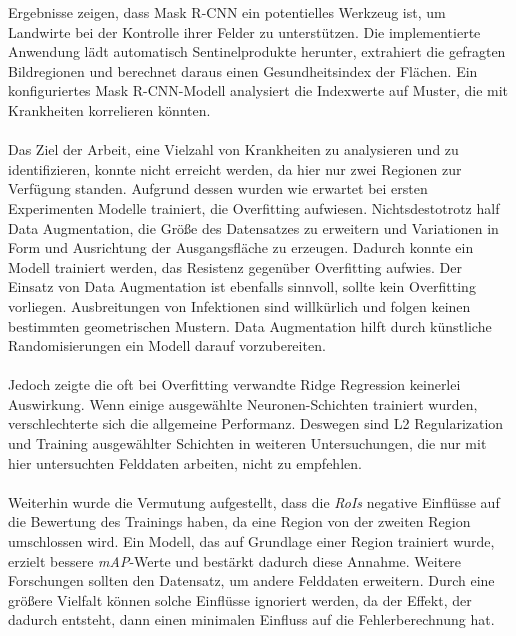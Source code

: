 Ergebnisse zeigen, dass Mask R-CNN ein potentielles Werkzeug ist, um Landwirte bei der Kontrolle ihrer Felder zu unterstützen. Die implementierte Anwendung lädt automatisch Sentinelprodukte herunter, extrahiert die gefragten Bildregionen und berechnet daraus einen Gesundheitsindex der Flächen. Ein konfiguriertes Mask R-CNN-Modell analysiert die Indexwerte auf Muster, die mit Krankheiten korrelieren könnten. 
\\\\
Das Ziel der Arbeit, eine Vielzahl von Krankheiten zu analysieren und zu identifizieren, konnte nicht erreicht werden, da hier nur zwei Regionen zur Verfügung standen. Aufgrund dessen wurden wie erwartet bei ersten Experimenten Modelle trainiert, die Overfitting aufwiesen. Nichtsdestotrotz half Data Augmentation, die Größe des Datensatzes zu erweitern und Variationen in Form und Ausrichtung der Ausgangsfläche zu erzeugen. Dadurch konnte ein Modell trainiert werden, das Resistenz gegenüber Overfitting aufwies. Der Einsatz von Data Augmentation ist ebenfalls sinnvoll, sollte kein Overfitting vorliegen. Ausbreitungen von Infektionen sind willkürlich und folgen keinen bestimmten geometrischen Mustern. Data Augmentation hilft durch künstliche Randomisierungen ein Modell darauf vorzubereiten.
\\\\
Jedoch zeigte die oft bei Overfitting verwandte Ridge Regression keinerlei Auswirkung. Wenn einige ausgewählte Neuronen-Schichten trainiert wurden, verschlechterte sich die allgemeine Performanz. Deswegen sind L2 Regularization und Training ausgewählter Schichten in weiteren Untersuchungen, die nur mit hier untersuchten Felddaten arbeiten, nicht zu empfehlen. 
\\\\
Weiterhin wurde die Vermutung aufgestellt, dass die \textit{RoIs} negative Einflüsse auf die Bewertung des Trainings haben, da eine Region von der zweiten Region umschlossen wird. Ein Modell, das auf Grundlage einer Region trainiert wurde, erzielt bessere \textit{mAP}-Werte und bestärkt dadurch diese Annahme. Weitere Forschungen sollten den Datensatz, um andere Felddaten erweitern. Durch eine größere Vielfalt können solche Einflüsse ignoriert werden, da der Effekt, der dadurch entsteht, dann einen minimalen Einfluss auf die Fehlerberechnung hat. 
\\\\
